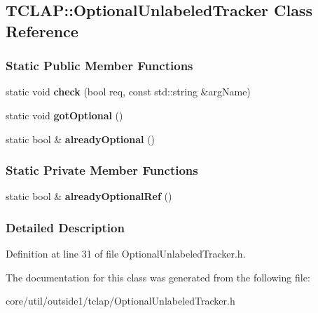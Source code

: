 \hypertarget{classTCLAP_1_1OptionalUnlabeledTracker}{}\subsection{T\+C\+L\+AP\+:\+:Optional\+Unlabeled\+Tracker Class Reference}
\label{classTCLAP_1_1OptionalUnlabeledTracker}
\subsubsection*{Static Public Member Functions}
\begin{DoxyCompactItemize}
\item 
static void {\bfseries check} (bool req, const std\+::string \&arg\+Name)\hypertarget{classTCLAP_1_1OptionalUnlabeledTracker_a59bfa7d01b45d4796500470c9218e390}{}\label{classTCLAP_1_1OptionalUnlabeledTracker_a59bfa7d01b45d4796500470c9218e390}

\item 
static void {\bfseries got\+Optional} ()\hypertarget{classTCLAP_1_1OptionalUnlabeledTracker_aca1fc2a02fbde351cce7ea05f0e6ef89}{}\label{classTCLAP_1_1OptionalUnlabeledTracker_aca1fc2a02fbde351cce7ea05f0e6ef89}

\item 
static bool \& {\bfseries already\+Optional} ()\hypertarget{classTCLAP_1_1OptionalUnlabeledTracker_a50fc04586196c0861491968fcdadf48b}{}\label{classTCLAP_1_1OptionalUnlabeledTracker_a50fc04586196c0861491968fcdadf48b}

\end{DoxyCompactItemize}
\subsubsection*{Static Private Member Functions}
\begin{DoxyCompactItemize}
\item 
static bool \& {\bfseries already\+Optional\+Ref} ()\hypertarget{classTCLAP_1_1OptionalUnlabeledTracker_a4e773e76c24d14316fc73826793f8dd5}{}\label{classTCLAP_1_1OptionalUnlabeledTracker_a4e773e76c24d14316fc73826793f8dd5}

\end{DoxyCompactItemize}


\subsubsection{Detailed Description}


Definition at line 31 of file Optional\+Unlabeled\+Tracker.\+h.



The documentation for this class was generated from the following file\+:\begin{DoxyCompactItemize}
\item 
core/util/outside1/tclap/Optional\+Unlabeled\+Tracker.\+h\end{DoxyCompactItemize}
